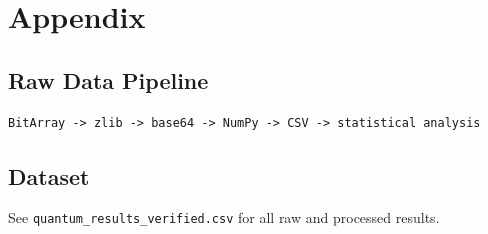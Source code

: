 \section{Appendix}

\subsection{Raw Data Pipeline}
\begin{verbatim}
BitArray -> zlib -> base64 -> NumPy -> CSV -> statistical analysis
\end{verbatim}

\subsection{Dataset}
See \texttt{quantum\_results\_verified.csv} for all raw and processed results.
